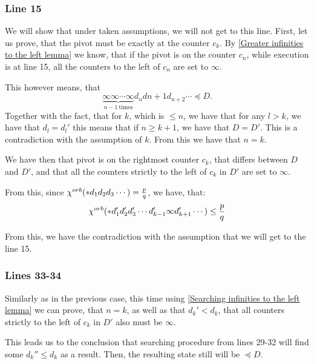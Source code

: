 \subsubsection{Line 15}
We will show that under taken assumptions, we will not get to this line. 
First, let us prove, that the pivot must be exactly at the counter $c_k$. 
By \ref{Greater infinities to the left lemma} we know, that if the pivot is 
on the counter $c_n$, while execution is at line 15, 
all the counters to the left of $c_n$ are set to $\infty$. 

This however means, that
\begin{equation}
\underbrace{\infty\infty\cdots\infty}_{n-1\ \mathrm{times}}d_nd{n+1}d_{n+2}\cdots \preceq D.
\end{equation}
Together with the fact, that for $k$, which is $\leq n$, we have that 
for any $l > k$, we have that $d_l = d_l'$ this means that if $n \geq k+1$, we have that 
$D = D'$. This is a contradiction with the assumption of $k$. 
From this we have that $n = k$.

We have then that pivot is on the rightmost counter $c_k$, 
that differs between $D$ and $D'$, and 
that all the counters strictly to the left of $c_k$ in $D'$ are set to $\infty$. 


From this, since ${\chi^{orb}(*d_1d_2d_3\cdots)} = \frac{p}{q}$, we have, that: 
\begin{equation}
{\chi^{orb}(*d_1'd_2'd_3'\cdots d_{k-1}'\infty d_{k+1}'\cdots)} \leq \frac{p}{q} 
\end{equation}

From this, we have the contradiction with the assumption that we will get to the line 15. 

\subsubsection{Lines 33-34}
Similarly as in the previous case, this time using \ref{Searching infinities to the left lemma} 
we can prove, that $n=k$, as well as that $d_k' < d_k$, that all 
counters strictly to the left of $c_k$ in $D'$ also must be $\infty$.

This leads us to the conclusion that searching procedure from lines 
29-32 will find some $ d_k'' \leq d_k$ as a result. Then, the resulting state 
still will be $\preceq D$. 

